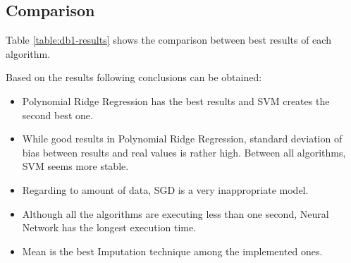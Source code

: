 \subsection{Comparison}
Table \ref{table:db1-results} shows the comparison between best results of each algorithm.

Based on the results following conclusions can be obtained:
\begin{itemize}
  \item Polynomial Ridge Regression has the best results and SVM creates the second best one.
  \item While good results in Polynomial Ridge Regression, standard deviation of bias between results and real values is rather high. Between all algorithms, SVM seems more stable.
  \item Regarding to amount of data, SGD is a very inappropriate model.
  \item Although all the algorithms are executing less than one second, Neural Network has the longest execution time.
  \item Mean is the best Imputation technique among the implemented ones.
\end{itemize}
